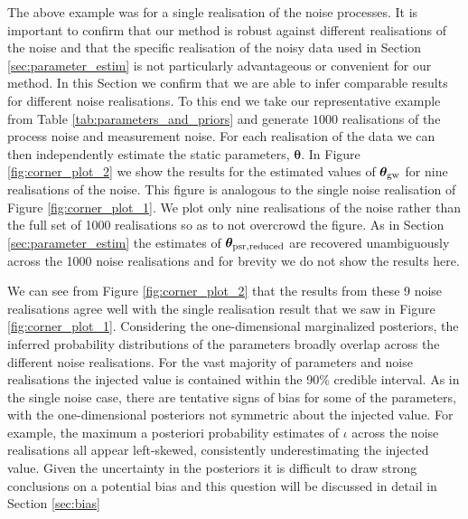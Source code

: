 \documentclass[fleqn,usenatbib,useAMS]{mnras}
\begin{document}
The above example was for a single realisation of the noise processes. It is important to confirm that our method is robust against different realisations of the noise and that the specific realisation of the noisy data used in Section \ref{sec:parameter_estim} is not particularly advantageous or convenient for our method. In this Section we confirm that we are able to infer comparable results for different noise realisations. To this end we take our representative example from Table \ref{tab:parameters_and_priors} and generate $1000$ realisations of the process noise and measurement noise. For each realisation of the data we can then independently estimate the static parameters, $\boldsymbol{\theta}$. In Figure \ref{fig:corner_plot_2} we show the results for the  estimated values of $\boldsymbol{\theta}_{\rm gw}$ for nine realisations of the noise. This figure is analogous to the single noise realisation of Figure \ref{fig:corner_plot_1}. We plot only nine realisations of the noise rather than the full set of 1000 realisations so as to not overcrowd the figure. As in Section \ref{sec:parameter_estim} the estimates of $\boldsymbol{\theta}_{\rm psr, reduced}$ are recovered unambiguously across the 1000 noise realisations and for brevity we do not show the results here. \newline 


We can see from Figure \ref{fig:corner_plot_2} that the results from these 9 noise realisations agree well with the single realisation result that we saw in  Figure \ref{fig:corner_plot_1}. Considering the one-dimensional marginalized posteriors, the inferred probability distributions of the parameters broadly overlap across the different noise realisations. For the vast majority of parameters and noise realisations the injected value is contained within the 90\% credible interval. As in the single noise case, there are tentative signs of bias for some of the parameters, with the one-dimensional posteriors not symmetric about the injected value. For example, the maximum a posteriori probability estimates of $\iota$ across the noise realisations all appear left-skewed, consistently underestimating the injected value. Given the uncertainty in the posteriors it is difficult to draw strong conclusions on a potential bias and this question will be discussed in detail in Section \ref{sec:bias} \newline 
\end{document}
